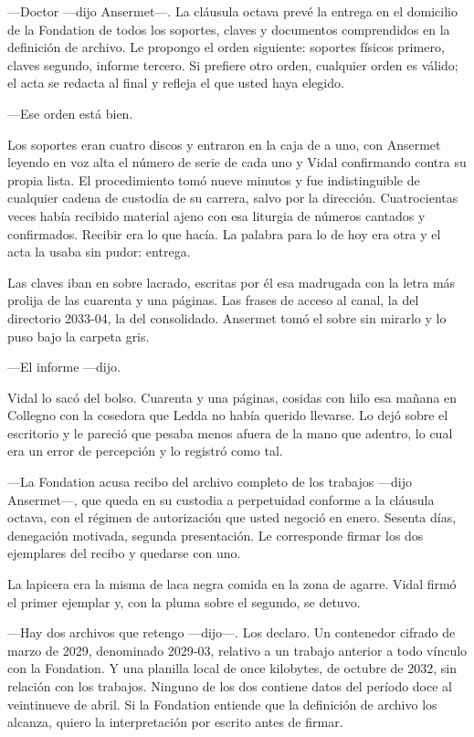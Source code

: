 ---Doctor ---dijo Ansermet---. La cláusula octava prevé la entrega en el domicilio de la Fondation de todos los soportes, claves y documentos comprendidos en la definición de archivo. Le propongo el orden siguiente: soportes físicos primero, claves segundo, informe tercero. Si prefiere otro orden, cualquier orden es válido; el acta se redacta al final y refleja el que usted haya elegido.

---Ese orden está bien.

Los soportes eran cuatro discos y entraron en la caja de a uno, con Ansermet leyendo en voz alta el número de serie de cada uno y Vidal confirmando contra su propia lista. El procedimiento tomó nueve minutos y fue indistinguible de cualquier cadena de custodia de su carrera, salvo por la dirección. Cuatrocientas veces había recibido material ajeno con esa liturgia de números cantados y confirmados. Recibir era lo que hacía. La palabra para lo de hoy era otra y el acta la usaba sin pudor: entrega.

Las claves iban en sobre lacrado, escritas por él esa madrugada con la letra más prolija de las cuarenta y una páginas. Las frases de acceso al canal, la del directorio 2033-04, la del consolidado. Ansermet tomó el sobre sin mirarlo y lo puso bajo la carpeta gris.

---El informe ---dijo.

Vidal lo sacó del bolso. Cuarenta y una páginas, cosidas con hilo esa mañana en Collegno con la cosedora que Ledda no había querido llevarse. Lo dejó sobre el escritorio y le pareció que pesaba menos afuera de la mano que adentro, lo cual era un error de percepción y lo registró como tal.

---La Fondation acusa recibo del archivo completo de los trabajos ---dijo Ansermet---, que queda en su custodia a perpetuidad conforme a la cláusula octava, con el régimen de autorización que usted negoció en enero. Sesenta días, denegación motivada, segunda presentación. Le corresponde firmar los dos ejemplares del recibo y quedarse con uno.

La lapicera era la misma de laca negra comida en la zona de agarre. Vidal firmó el primer ejemplar y, con la pluma sobre el segundo, se detuvo.

---Hay dos archivos que retengo ---dijo---. Los declaro. Un contenedor cifrado de marzo de 2029, denominado 2029-03, relativo a un trabajo anterior a todo vínculo con la Fondation. Y una planilla local de once kilobytes, de octubre de 2032, sin relación con los trabajos. Ninguno de los dos contiene datos del período doce al veintinueve de abril. Si la Fondation entiende que la definición de archivo los alcanza, quiero la interpretación por escrito antes de firmar.

